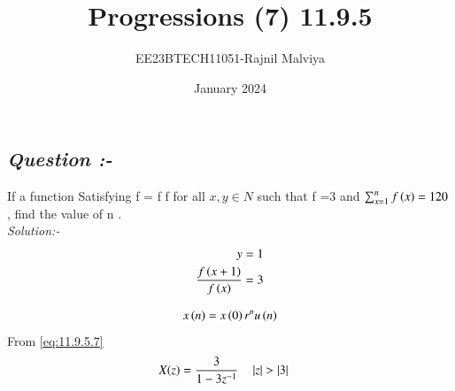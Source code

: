 \documentclass[journal,12pt,twocolumn]{IEEEtran}
\theoremstyle{remark}
\begin{document}
\title{Progressions (7) 11.9.5}
\author{EE23BTECH11051-Rajnil Malviya}
\date{January 2024}
\maketitle
\subsection*{\textit{Question :-}}
If a function Satisfying f = f f for all $x,y \in {N}$ such that f =3 and $\sum_{x=1}^{n} f\left(x\right) = 120$ , find the value of n .\\
\textit{Solution:- }
\begin{align}
    y&=1\\
    \frac{f\left(x+1\right)}{f\left(x\right)}&=3
\end{align}
\begin{table}[h!]
            
    \end{table}
\begin{align}
x \left(n\right) = x \left(0\right)r^{n}u\left(n\right)
\label{eq:11.9.5.7}
\end{align}
From \eqref{eq:11.9.5.7}
\begin{align}
X(z) &=\frac{3}{1-3z^{-1}} \quad \left\vert z\right\vert > \left\vert3\right\vert
\end{align}
\end{document}
